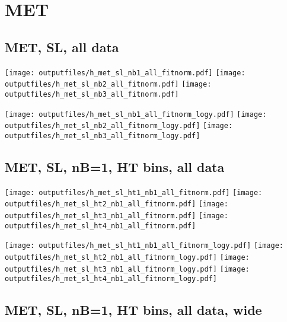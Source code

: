 \documentclass[11pt]{article}
\begin{document}
    \section{MET}
     \subsection{ MET, SL, all data}

    \noindent
     \texttt{[image: outputfiles/h\_met\_sl\_nb1\_all\_fitnorm.pdf]}
     \texttt{[image: outputfiles/h\_met\_sl\_nb2\_all\_fitnorm.pdf]}
     \texttt{[image: outputfiles/h\_met\_sl\_nb3\_all\_fitnorm.pdf]}

    \noindent
     \texttt{[image: outputfiles/h\_met\_sl\_nb1\_all\_fitnorm\_logy.pdf]}
     \texttt{[image: outputfiles/h\_met\_sl\_nb2\_all\_fitnorm\_logy.pdf]}
     \texttt{[image: outputfiles/h\_met\_sl\_nb3\_all\_fitnorm\_logy.pdf]}


     \subsection{ MET, SL, nB=1, HT bins, all data}


    \noindent
     \texttt{[image: outputfiles/h\_met\_sl\_ht1\_nb1\_all\_fitnorm.pdf]}
     \texttt{[image: outputfiles/h\_met\_sl\_ht2\_nb1\_all\_fitnorm.pdf]}
     \texttt{[image: outputfiles/h\_met\_sl\_ht3\_nb1\_all\_fitnorm.pdf]}
     \texttt{[image: outputfiles/h\_met\_sl\_ht4\_nb1\_all\_fitnorm.pdf]}

    \noindent
     \texttt{[image: outputfiles/h\_met\_sl\_ht1\_nb1\_all\_fitnorm\_logy.pdf]}
     \texttt{[image: outputfiles/h\_met\_sl\_ht2\_nb1\_all\_fitnorm\_logy.pdf]}
     \texttt{[image: outputfiles/h\_met\_sl\_ht3\_nb1\_all\_fitnorm\_logy.pdf]}
     \texttt{[image: outputfiles/h\_met\_sl\_ht4\_nb1\_all\_fitnorm\_logy.pdf]}



     \clearpage
     \subsection{ MET, SL, nB=1, HT bins, all data, wide}
\end{document}
